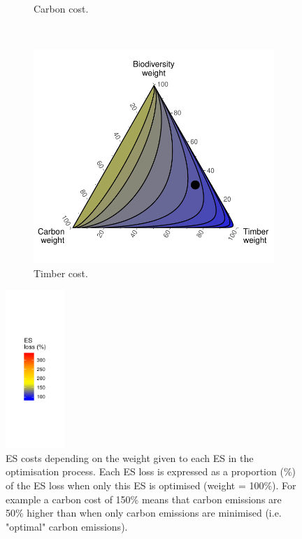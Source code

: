 \documentclass{article}
\begin{document}
\begin{figure}
\begin{subfigure}[b]{0.45\textwidth}
        \caption{Carbon cost.}
        \label{fig:costCarb}
    \end{subfigure}
    \\
    \begin{subfigure}[b]{0.45\textwidth}
        \includegraphics[width=\textwidth]{graphs/timberLoss.pdf}
        \caption{Timber cost.}
        \label{fig:costTimb}
    \end{subfigure} 
    \includegraphics[width=0.2\textwidth]{graphs/legendESloss.pdf}
    \caption{ES costs depending on the weight given to each ES in the optimisation process. Each ES loss is expressed as a proportion (\%) of the ES loss when only this ES is optimised (weight = 100\%). For example a carbon cost of 150\% means that carbon emissions are 50\% higher than when only carbon emissions are minimised (i.e. "optimal" carbon emissions). } \label{fig:changeCosts}

\end{figure}
\end{document}
